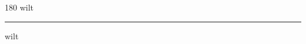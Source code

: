 
\begin{frame}
\begin{center}
\begin{turn}{180}
{\fontsize{2.5cm}{1em}\selectfont wilt}
\end{turn}
\vspace{1em}\par  
\hrule
\vspace{1em}\par  
{\fontsize{2.5cm}{1em}\selectfont wilt}
\end{center}
\end{frame}
